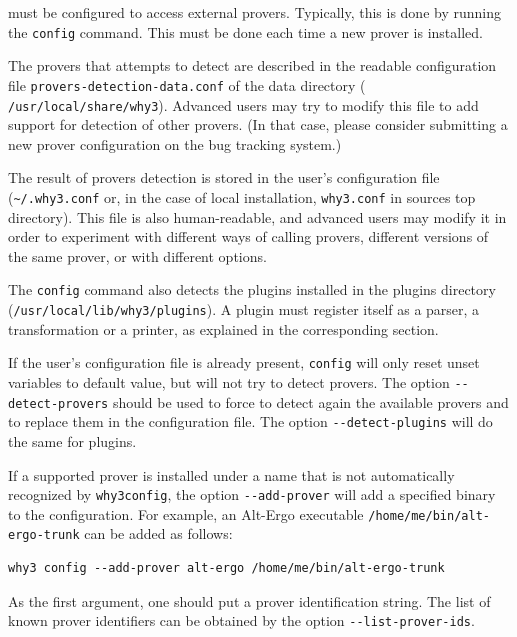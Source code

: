 \why must be configured to access external provers. Typically, this is done
by running the \texttt{config} command.
This must be done each time a new prover is installed.%
%

The provers that \why attempts to detect are described in
the readable configuration file \texttt{provers-detection-data.conf}
of the \why data directory (\eg
\texttt{/usr/local/share/why3}). Advanced users may try to modify this
file to add support for detection of other provers. (In that case,
please consider submitting a new prover configuration on the bug
tracking system.)

The result of provers detection is stored in the user's
configuration file (\verb+~/.why3.conf+ or, in the case of local
installation, \verb+why3.conf+ in \why sources top directory). This file
is also human-readable, and advanced users may modify it in order to
experiment with different ways of calling provers, \eg different
versions of the same prover, or with different options.

The \texttt{config} command also detects the plugins installed in the \why
plugins directory (\eg \texttt{/usr/local/lib/why3/plugins}). A
plugin must register itself as a parser, a transformation or a
printer, as explained in the corresponding section.

If the user's configuration file is already present,
\texttt{config} will only reset unset variables to default value,
but will not try to detect provers.
The option \verb|--detect-provers| should be used to force
\why to detect again the available
provers and to replace them in the configuration file. The option
\verb|--detect-plugins| will do the same for plugins.

If a supported prover is installed under a name
that is not automatically recognized by \texttt{why3config},
the option \verb|--add-prover| will add a specified binary
to the configuration. For example, an Alt-Ergo executable
\verb|/home/me/bin/alt-ergo-trunk| can be added as follows:
\begin{verbatim}
why3 config --add-prover alt-ergo /home/me/bin/alt-ergo-trunk
\end{verbatim}
As the first argument, one should put a prover
identification string. The list of known prover identifiers
can be obtained by the option \verb|--list-prover-ids|.

